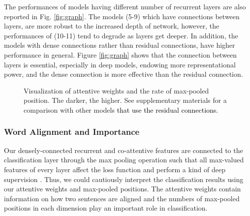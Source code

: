\documentclass[letterpaper]{article} \usepackage{aaai19}  \usepackage{times}  \usepackage{helvet}  \usepackage{courier}  \usepackage{url}  \usepackage{graphicx}  \frenchspacing  \setlength{\pdfpagewidth}{8.5in}  \setlength{\pdfpageheight}{11in}
\newcommand\sh[1]{\textcolor{black}{#1}}
\begin{document}
The performances of models having different number of recurrent layers are also reported in Fig. \ref{fig:graph}. The models (5-9) which have connections between layers, are more robust to the increased depth of network, however, the performances of (10-11) tend to degrade as layers get deeper. In addition, the models with dense connections rather than residual connections, have higher performance in general. Figure \ref{fig:graph} shows that the connection between layers is essential, especially in deep models, endowing more representational power, and the dense connection is more effective than the residual connection.














\begin{figure*}[t]
  \centering  
  
  
  \caption{Visualization of attentive weights and the rate of max-pooled position. The darker, the higher. See supplementary materials for a comparison with other models \sh{that use the residual connections.}
}  
  \label{fig:exp_att}
\end{figure*}

\subsubsection{Word Alignment and Importance}

Our densely-connected recurrent and co-attentive features are connected to the classification layer through the max pooling operation such that all max-valued features of every layer affect the loss function and perform a kind of deep supervision \cite{huang2017densely}. Thus, we could cautiously interpret the classification results using our attentive weights and max-pooled positions. The attentive weights contain information on how two sentences are aligned and the numbers of max-pooled positions in each dimension play an important role in classification.
\end{document}
